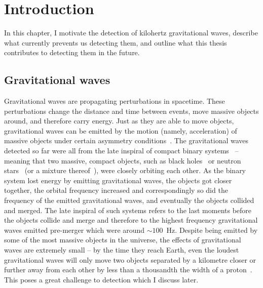 \chapter{Introduction} %





In this chapter, I motivate the detection of kilohertz gravitational waves, describe what currently prevents us detecting them, and outline what this thesis contributes to detecting them in the future.


\section{Gravitational waves}

Gravitational waves are propagating perturbations in spacetime.
These perturbations change the distance and time between events, move massive objects around, and therefore carry energy.
Just as they are able to move objects, gravitational waves can be emitted by the motion (namely, acceleration) of massive objects under certain asymmetry conditions~\cite{}.
The gravitational waves detected so far were all from the late inspiral of compact binary systems~\cite{} -- meaning that two massive, compact objects, such as black holes~\cite{} or neutron stars~\cite{} (or a mixture thereof~\cite{}), were closely orbiting each other. As the binary system lost energy by emitting gravitational waves, the objects got closer together, the orbital frequency increased and correspondingly so did the frequency of the emitted gravitational waves, and eventually the objects collided and merged. The late inspiral of such systems refers to the last moments before the objects collide and merge and therefore to the highest frequency gravitational waves emitted pre-merger which were around $\sim 100$~Hz.
Despite being emitted by some of the most massive objects in the universe, the effects of gravitational waves are extremely small -- by the time they reach Earth, even the loudest gravitational waves will only move two objects separated by a kilometre closer or further away from each other by less than a thousandth the width of a proton~\cite{}. %
This poses a great challenge to detection which I discuss later.

